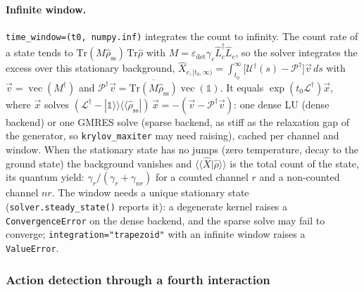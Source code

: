 \documentclass[11pt]{article}
\begin{document}
\paragraph{Infinite window.} \texttt{time\_window=(t0, numpy.inf)} integrates the count to infinity. The count rate of a state tends to $\mathrm{Tr}(M\hat\rho_{\mathrm{ss}})\,\mathrm{Tr}\hat\rho$ with $M=\varepsilon_{\mathrm{det}}\gamma_c\hat L_c^\dagger\hat L_c$, so the solver integrates the excess over this stationary background, $\hat X_{c,[t_0,\infty)}=\int_{t_0}^{\infty}\big[\mathcal{U}^\dagger(s)-\mathcal{P}^\dagger\big]\vec{v}\,ds$ with $\vec v=\operatorname{vec}(M^\dagger)$ and $\mathcal{P}^\dagger\vec v=\overline{\mathrm{Tr}(M\hat\rho_{\mathrm{ss}})}\operatorname{vec}(\mathbb{1})$. It equals $\exp(t_0\mathcal{L}^\dagger)\vec x$, where $\vec x$ solves $(\mathcal{L}^\dagger-|\mathbb{1}\rangle\!\rangle\langle\!\langle\hat\rho_{\mathrm{ss}}|)\,\vec x=-(\vec v-\mathcal{P}^\dagger\vec v)$: one dense LU (dense backend) or one GMRES solve (sparse backend, as stiff as the relaxation gap of the generator, so \texttt{krylov\_maxiter} may need raising), cached per channel and window. When the stationary state has no jumps (zero temperature, decay to the ground state) the background vanishes and $\langle\!\langle\hat X|\hat\rho\rangle\!\rangle$ is the total count of the state, its quantum yield: $\gamma_r/(\gamma_r+\gamma_{nr})$ for a counted channel $r$ and a non-counted channel $nr$. The window needs a unique stationary state (\texttt{solver.steady\_state()} reports it): a degenerate kernel raises a \texttt{ConvergenceError} on the dense backend, and the sparse solve may fail to converge; \texttt{integration="trapezoid"} with an infinite window raises a \texttt{ValueError}.

\subsubsection{Action detection through a fourth interaction}
\end{document}

